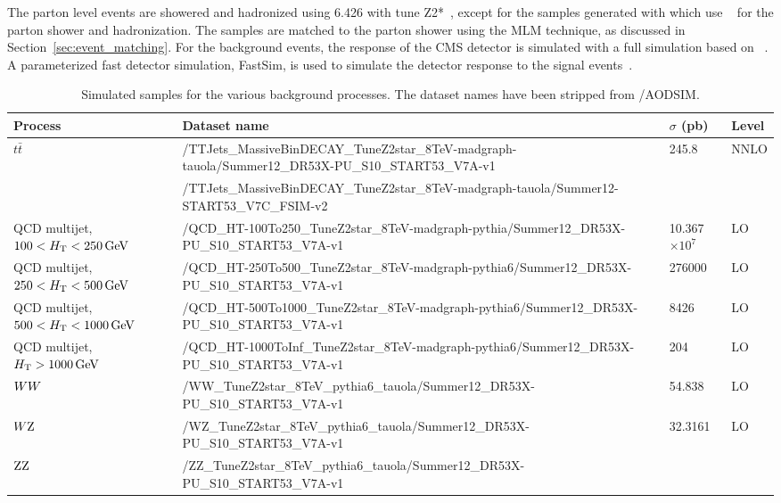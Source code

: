 The parton level events are showered and hadronized using {\PYTHIA}6.426 with tune
Z2*~\cite{Chatrchyan:2013gfi}, except for the samples generated with \AMCATNLO which use 
\HERWIG~\cite{Corcella:2000bw,Corcella:2002jc} for the parton shower and hadronization.  
The \MADGRAPH samples are matched to the parton shower using the MLM technique, as discussed
in Section~\ref{sec:event_matching}.
For the background events, the response of the CMS detector is
simulated with a full simulation based on \GEANTfour~\cite{G4}.  A parameterized fast detector
simulation, \ie FastSim, is used to simulate the detector response to the signal
events~\cite{fastsim}. 

\begin{table}
\fontsize{8 pt}{1 em}
\selectfont
\caption{Simulated samples for the various background processes. The dataset names have been stripped 
from /AODSIM.}
\begin{center}
\begin{tabular}{l l l l}
\toprule
Process & Dataset name & $\sigma$ (pb) & Level \\
\midrule
\multirow{2}{*}{$t\bar{t}$} &
/TTJets\_MassiveBinDECAY\_TuneZ2star\_8TeV-madgraph-tauola/Summer12\_DR53X-PU\_S10\_START53\_V7A-v1 
& 245.8 & NNLO \\
& /TTJets\_MassiveBinDECAY\_TuneZ2star\_8TeV-madgraph-tauola/Summer12-START53\_V7C\_FSIM-v2 & & \\
\midrule
QCD multijet, $100 < H_{\mathrm{T}}< 250\,\text{Ge\hspace{-.08em}V}$ & 
/QCD\_HT-100To250\_TuneZ2star\_8TeV-madgraph-pythia/Summer12\_DR53X-PU\_S10\_START53\_V7A-v1
& 10.367$\times 10^{7}$ & LO \\
QCD multijet, $250 < H_{\mathrm{T}}< 500\,\text{Ge\hspace{-.08em}V}$ &  
/QCD\_HT-250To500\_TuneZ2star\_8TeV-madgraph-pythia6/Summer12\_DR53X-PU\_S10\_START53\_V7A-v1
& 276000 & LO \\
QCD multijet, $500 < H_{\mathrm{T}}< 1000\,\text{Ge\hspace{-.08em}V}$ & 
/QCD\_HT-500To1000\_TuneZ2star\_8TeV-madgraph-pythia6/Summer12\_DR53X-PU\_S10\_START53\_V7A-v1 
& 8426 & LO \\
QCD multijet, $H_{\mathrm{T}} > 1000\,\text{Ge\hspace{-.08em}V}$ & 
/QCD\_HT-1000ToInf\_TuneZ2star\_8TeV-madgraph-pythia6/Summer12\_DR53X-PU\_S10\_START53\_V7A-v1 
& 204 & LO \\
\midrule
$WW$ & /WW\_TuneZ2star\_8TeV\_pythia6\_tauola/Summer12\_DR53X-PU\_S10\_START53\_V7A-v1 &
54.838 & LO \\
$W\mathrm{Z}$ & /WZ\_TuneZ2star\_8TeV\_pythia6\_tauola/Summer12\_DR53X-PU\_S10\_START53\_V7A-v1 
& 32.3161 & LO \\
$\mathrm{Z}\mathrm{Z}$ & /ZZ\_TuneZ2star\_8TeV\_pythia6\_tauola/Summer12\_DR53X-PU\_S10\_START53\_V7A-v1

\end{tabular}
\end{center}
\end{table}
